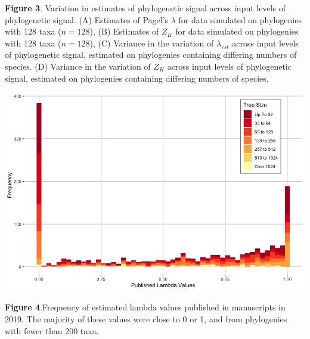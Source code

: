\documentclass[
]{article}
\begin{document}
\singlespacing \textbf{Figure 3}. Variation in estimates of phylogenetic
signal across input levels of phylogenetic signal. (A) Estimates of
Pagel's \(\lambda\) for data simulated on phylogenies with 128 taxa
(\(n=128\)), (B) Estimates of \(Z_K\) for data simulated on phylogenies
with 128 taxa (\(n=128\)), (C) Variance in the variation of
\(\lambda_{est}\) across input levels of phylogenetic signal, estimated
on phylogenies containing differing numbers of species. (D) Variance in
the variation of \(Z_K\) across input levels of phylogenetic signal,
estimated on phylogenies containing differing numbers of species.

\newpage

\includegraphics[width=0.95\linewidth]{Fig4}

\singlespacing \textbf{Figure 4}.Frequency of estimated lambda values
published in manuscripts in 2019. The majority of these values were
close to 0 or 1, and from phylogenies with fewer than 200 taxa.
\end{document}

